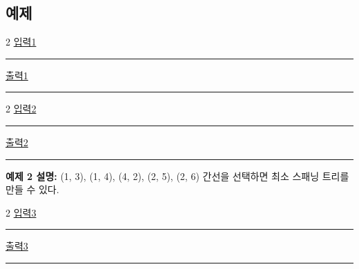 \documentclass{article}
\def\inputdataname{입력} %
\def\outputdataname{출력} %
\newcommand{\iodataNo}[1]{%
	\begin{minipage}{\textwidth}
		\begin{multicols}{2}
			\href{run:input#1.txt}{\inputdataname#1} \\
			\rule{\columnwidth}{1pt}
			
			\columnbreak
			\href{run:output#1.txt}{\outputdataname#1} \\
			\rule{\columnwidth}{1pt}
			
		\end{multicols}
		\vspace{\baselineskip}
	\end{minipage}

}
\begin{document}
\subsection{예제}

\iodataNo{1}
\iodataNo{2}



\textbf{예제 2 설명:} (1, 3), (1, 4), (4, 2), (2, 5), (2, 6) 간선을 선택하면 최소 스패닝 트리를 만들 수 있다. \newline

\iodataNo{3}

\newpage
\end{document}
